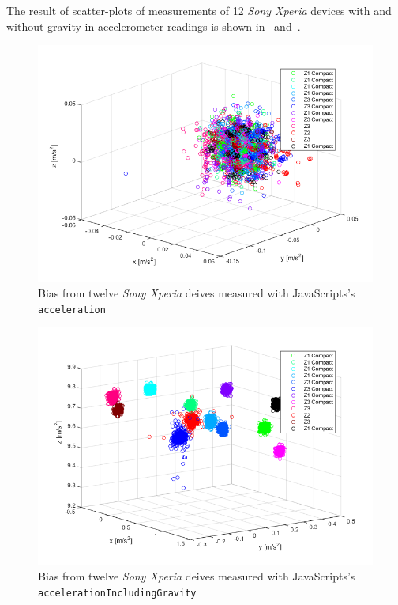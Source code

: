 The result of scatter-plots of measurements of 12 \textit{Sony Xperia} devices with and without gravity in accelerometer readings is shown in~ and~.
\begin{figure}[H]
	\centering
	\includegraphics[scale=0.6]{img/res-measure1-scatter-notG}
	\caption{Bias from twelve \textit{Sony Xperia} deives measured with JavaScripts's \texttt{acceleration}}
	\label{fig:scatter-withoutGrav}
\end{figure}
\begin{figure}[H]
	\centering
	\includegraphics[scale=0.6]{img/res-measure1-scatter-inclG}
	\caption{Bias from twelve \textit{Sony Xperia} deives measured with JavaScripts's \texttt{accelerationIncludingGravity}}
	\label{fig:scatter-withGrav}
\end{figure}
